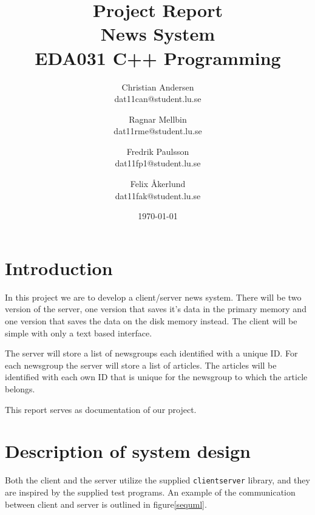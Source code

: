 \documentclass[a4paper]{article}
\title{Project Report \\ News System  \\ EDA031 C++ Programming}
\date{\today}
\author{Christian Andersen \\ dat11can@student.lu.se \and Ragnar Mellbin \\ dat11rme@student.lu.se \and Fredrik Paulsson \\ dat11fp1@student.lu.se
\and Felix \AA kerlund \\ dat11fak@student.lu.se}
\begin{document}
\clearpage\maketitle
\thispagestyle{empty}
\newpage


\section{Introduction}
In this project we are to develop a client/server news system. There will be two version of the server, one version that saves it's data in the primary memory and one version that saves the data on the disk memory instead. The client will be simple with only a text based interface.

The server will store a list of newsgroups each identified with a unique ID. For each newsgroup the server will store a list of articles. The articles will be identified with each own ID that is unique for the newsgroup to which the article belongs.

This report serves as documentation of our project.

\section{Description of system design}

Both the client and the server utilize the supplied \texttt{clientserver} library, and they are inspired by the supplied test programs. An example of the communication between client and server is outlined in figure\ref{sequml}.
\end{document}
